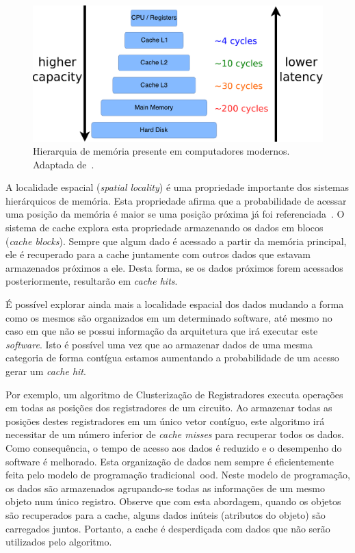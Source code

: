 \begin{figure}[h]
    \centering
    \includegraphics[width=0.7\linewidth]{img/tecnica/memoryHierarchy}
    \caption[Hierarquia de memória]{Hierarquia de memória presente em computadores modernos. Adaptada de~\cite{patterson2013computer}.}
    \label{fig:memoryHierarchy}
\end{figure}


A localidade espacial (\textit{spatial locality}) é uma propriedade importante dos sistemas hierárquicos de memória. Esta propriedade afirma que a probabilidade de acessar uma posição da memória é maior se uma posição próxima já foi referenciada~\cite{patterson2013computer}. O sistema de cache explora esta propriedade armazenando os dados em blocos (\textit{cache blocks}). Sempre que algum dado é acessado a partir da memória principal, ele é recuperado para a cache juntamente com outros dados que estavam armazenados próximos a ele. Desta forma, se os dados próximos forem acessados posteriormente, resultarão em \textit{cache hits}.

É possível explorar ainda mais a localidade espacial dos dados mudando a forma como os mesmos são organizados em um determinado software, até mesmo no caso em que não se possui informação da arquitetura que irá executar este \textit{software}.
Isto é possível uma vez que ao armazenar dados de uma mesma categoria de forma contígua estamos aumentando a probabilidade de um acesso gerar um \textit{cache hit}.

Por exemplo, um algoritmo de Clusterização de Registradores executa operações em todas as posições dos registradores de um circuito.
Ao armazenar todas as posições destes registradores em um único vetor contíguo, este algoritmo irá necessitar de um número inferior de \textit{cache misses} para recuperar todos os dados.
Como consequência, o tempo de acesso aos dados é reduzido e o desempenho do software é melhorado. Esta organização de dados nem sempre é eficientemente feita pelo modelo de programação tradicional~\ac{ood}.
Neste modelo de programação, os dados são armazenados agrupando-se todas as informações de um mesmo objeto num único registro.
Observe que com esta abordagem, quando os objetos são recuperados para a cache, alguns dados inúteis (atributos do objeto) são carregados juntos. Portanto, a cache é desperdiçada com dados que não serão utilizados pelo algoritmo.

